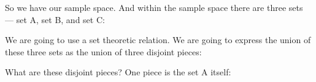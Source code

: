 \documentclass[pdftex, brazil, 12pt, twoside]{article}
\begin{document}
\begin{figure}[H]
  \begin{center}
  \end{center}
\end{figure}

So we have our sample space.
And within the sample space there are three sets --- set A,
set B, and set C:

\begin{figure}[H]
  \begin{center}
  \end{center}
\end{figure}

We are going to use a set theoretic relation.
We are going to express the union of these three sets as
the union of three disjoint pieces:

\begin{figure}[H]
  \begin{center}
  \end{center}
\end{figure}

What are these disjoint pieces?
One piece is the set A itself:

\begin{figure}[H]
  \begin{center}
  \end{center}
\end{figure}
\end{document}

